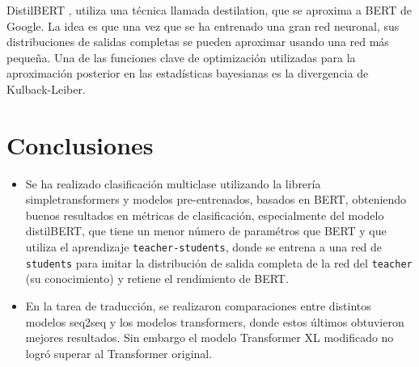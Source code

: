 \documentclass[conference]{IEEEtran}
\begin{document}
DistilBERT \cite{b11}, utiliza una técnica llamada destilation, que se aproxima a BERT de Google. La idea es que una vez que se ha entrenado una gran red neuronal, sus distribuciones de salidas completas se pueden aproximar usando una red más pequeña. Una de las funciones clave de optimización utilizadas para la aproximación posterior en las estadísticas bayesianas es la divergencia de Kulback-Leiber.

\section{Conclusiones}

\begin{itemize}
\item Se ha realizado clasificaci\'on multiclase utilizando la librer\'ia simpletransformers y modelos pre-entrenados, basados en BERT, obteniendo buenos resultados en m\'etricas de clasificaci\'on, especialmente del modelo distilBERT, que tiene un menor n\'umero de param\'etros que BERT y que utiliza el aprendizaje \texttt{teacher-students}, donde se entrena a una red de \texttt{students} para imitar la distribuci\'on de salida completa de la red del \texttt{teacher} (su conocimiento) y retiene el rendimiento de BERT.
\item En la tarea de traducci\'on, se realizaron comparaciones entre distintos modelos seq2seq y los modelos transformers, donde estos \'ultimos obtuvieron mejores resultados. Sin embargo el modelo Transformer XL modificado no logr\'o superar al Transformer original.
\end{itemize}
\end{document}
